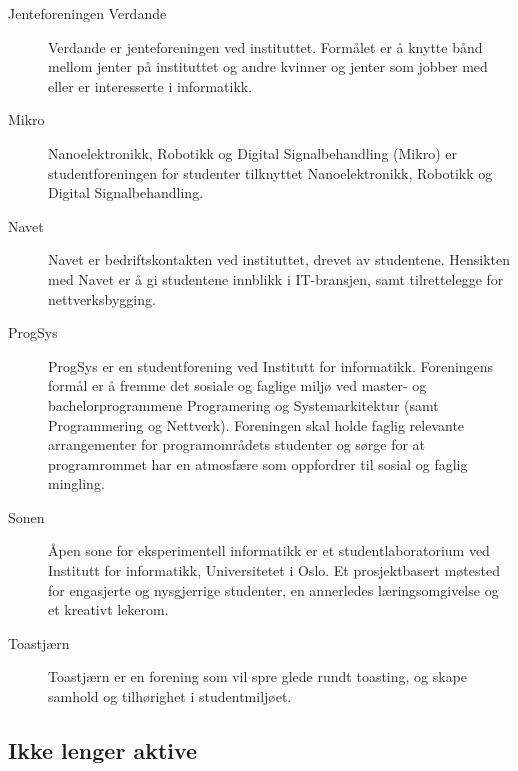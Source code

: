 \begin{description}
	\item [Jenteforeningen Verdande] Verdande er jenteforeningen ved instituttet. Formålet er å knytte bånd mellom jenter på instituttet og andre kvinner og jenter som jobber med eller er interesserte i informatikk.
	\item [Mikro] Nanoelektronikk, Robotikk og Digital Signalbehandling (Mikro) er studentforeningen for studenter tilknyttet Nanoelektronikk, Robotikk og Digital Signalbehandling.
	\item [Navet] Navet er bedriftskontakten ved instituttet, drevet av studentene. Hensikten med Navet er å gi studentene innblikk i IT-bransjen, samt tilrettelegge for nettverksbygging.
	\item [ProgSys] ProgSys er en studentforening ved Institutt for informatikk. Foreningens formål er å fremme det sosiale og faglige miljø ved master- og bachelorprogrammene Programering og Systemarkitektur (samt Programmering og Nettverk). Foreningen skal holde faglig relevante arrangementer for programområdets studenter og sørge for at programrommet har en atmosfære som oppfordrer til sosial og faglig mingling.
	\item [Sonen] Åpen sone for eksperimentell informatikk er et studentlaboratorium ved Institutt for informatikk, Universitetet i Oslo. Et prosjektbasert møtested for engasjerte og nysgjerrige studenter, en annerledes læringsomgivelse og et kreativt lekerom.
	\item [Toastjærn] Toastjærn er en forening som vil spre glede rundt toasting, og skape samhold og tilhørighet i studentmiljøet.
\end{description}

\subsection*{Ikke lenger aktive}

